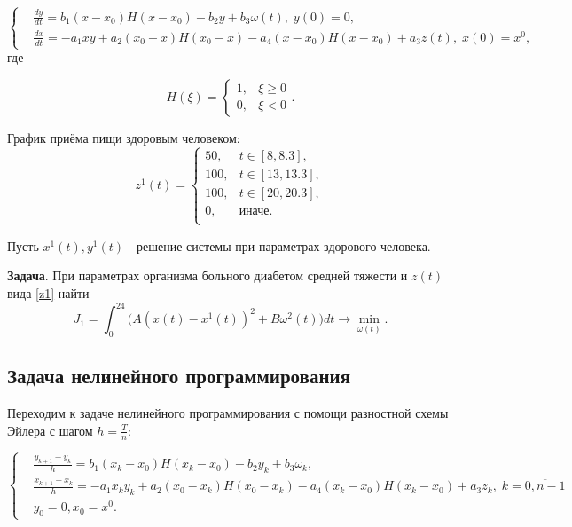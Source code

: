 \documentclass[14pt]{article}
\begin{document}
\begin{equation}\label{syst1}
\left\{ \begin{aligned}
& \frac{dy}{dt} = b_1(x-x_{0})H(x-x_{0}) - b_2 y+b_{3}\omega(t), \; y(0) = 0, \\
& \frac{dx}{dt} = - a_{1}xy+a_2(x_0-x)H(x_0-x)-a_4(x-x_0)H(x-x_0)+a_3 z(t), \; x(0) = x^0,
\end{aligned}\right.
\end{equation}
где

$$
H(\xi) = \begin{cases} 1, & \xi \ge 0 \\ 0, & \xi < 0 \end{cases}.
$$

График приёма пищи здоровым человеком:
\begin{equation}\label{z1}
z^1(t) = \begin{cases}
           50,& t \in [8, 8.3], \\
           100 , & t \in [13, 13.3], \\
           100 , & t \in [20,20.3],\\
           0, & \mbox{иначе}. \\
\end{cases}
\end{equation}

Пусть $ x^1(t), y^1(t) $ - решение системы при параметрах здорового человека.

\textbf{Задача}. При параметрах организма больного диабетом средней тяжести и  $z(t)$ вида \eqref{z1} найти
$$
J_1 = \int_0^{24} \Big( A(x(t)-x^1(t))^2 + B\omega^2(t)\Big) dt \rightarrow \min_{\omega(t)}.
$$

\subsection{Задача нелинейного программирования}

Переходим к задаче нелинейного программирования с помощи разностной схемы Эйлера с шагом $h=\frac{T}{n}$:

\begin{equation}\label{NLP1}
\left\{ \begin{aligned}
& \frac{y_{k+1}-y_k}{h} = b_1(x_k-x_0)H(x_k-x_0) - b_2 y_k+b_{3}\omega_k, \\
& \frac{x_{k+1}-x_k}{h} = - a_{1}x_k y_k+a_2(x_0-x_k)H(x_0-x_k)-a_4(x_k-x_0)H(x_k-x_0)+a_3 z_k,\; k = \overline{0,n-1} \\
& y_0 = 0 , x_0 = x^0.
\end{aligned}\right.
\end{equation}
\end{document}
